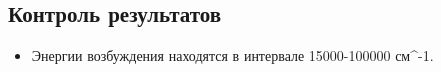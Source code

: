 \subsection{Контроль результатов}
\begin{itemize}
    \item Энергии возбуждения находятся в интервале 15000-100000 см^{-1}.
\end{itemize}{}